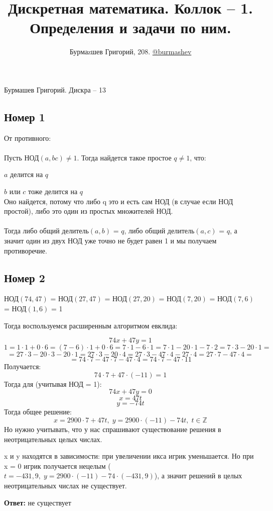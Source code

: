 \documentclass[a4paper,12pt]{article}
\author{Бурмаzшев Григорий, 208. \href{https://teleg.run/burmashev}{@burmashev}}
\title{Дискретная математика. Коллок -- 1. Определения и задачи по ним.}
\begin{document}
\begin{center}
Бурмашев Григорий. Дискра -- 13
\end{center}
\subsection*{Номер 1}
От противного:
\\\\
Пусть НОД$(a, bc) \neq 1$. Тогда найдется такое простое $q \neq 1$, что:

$a$ делится на $q$ 

 $b$ или $c$ тоже делится на $q$ 
\\
Оно найдется, потому что либо q это и есть сам НОД (в случае если НОД простой), либо это один из простых множителей НОД.
\\\\
Тогда либо общий делитель$(a, b)$ = $q$, либо общий делитель$(a, c)$ = $q$, а значит один из двух НОД уже точно не будет равен 1 и мы получаем противоречие.
\subsection*{Номер 2}
НОД$(74, 47)$ = НОД$(27, 47)$ = НОД$(27, 20)$ = НОД$(7, 20)$ = НОД$(7, 6)$ =  НОД$(1, 6)$ = 1

Тогда воспользуемся расширенным алгоритмом евклида:

\[
74x +  47y = 1
\]
\[
1 = 1 \cdot 1 + 0 \cdot 6 = (7 -6) \cdot 1 + 0 \cdot 6 = 7 \cdot 1 - 6 \cdot 1 = 7 \cdot 1 - 20 \cdot 1- 7 \cdot 2 = 7 \cdot 3 - 20 \cdot 1 =
\]
\[
= 27 \cdot 3 - 20 \cdot 3 - 20 \cdot 1 = 27 \cdot 3 - 20 \cdot 4 = 27 \cdot 3- 47 \cdot 4 - 27 \cdot 4 = 27 \cdot 7 - 47 \cdot 4 = 
\]
\[
= 74 \cdot 7 - 47 \cdot 7 - 47 \cdot 4 = 74 \cdot 7 - 47 \cdot 11
\]
Получается:
\[
74 \cdot 7 + 47 \cdot (-11) = 1
\]
Тогда для (учитывая НОД = 1):
\[
74x + 47y = 0
\]
\[
x = 47t
\]
\[
y = -74t
\]
Тогда общее решение:
\[
x = 2900 \cdot 7 + 47t, \; y = 2900 \cdot (-11) - 74t, \; t \in \mathbb{Z}
\]
Но нужно учитывать, что у нас спрашивают существование решения в неотрицательных целых числах.

x и y находятся в зависимости: при увеличении икса игрик уменьшается. Но при x = 0 игрик получается нецелым ($t = -431,9, \; y = 2900 \cdot (-11) - 74 \cdot (-431,9)$), а значит решений в целых неотрицательных числах не существует. 
\begin{center}
\textbf{Ответ:} не существует
\end{center}
\newpage
\end{document}
